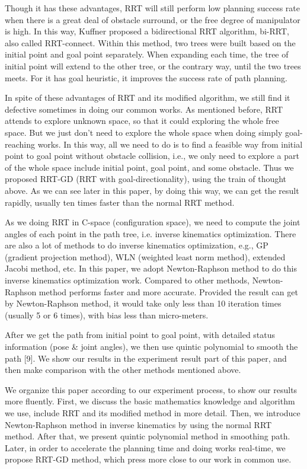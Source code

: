 \documentclass[letterpaper, 10 pt, conference]{ieeeconf}  %
\begin{document}
Though it has these advantages, RRT will still perform low planning success rate when there is a great deal of obstacle surround, or the free degree of manipulator is high. In this way, Kuffner proposed a bidirectional RRT algorithm, bi-RRT, also called RRT-connect. Within this method, two trees were built based on the initial point and goal point separately. When expanding each time, the tree of initial point will extend to the other tree, or the contrary way, until the two trees meets. For it has goal heuristic, it improves the success rate of path planning.  

In spite of these advantages of RRT and its modified algorithm, we still find it defective sometimes in doing our common works. As mentioned before, RRT attends to explore unknown space, so that it could exploring the whole free space. But we just don’t need to explore the whole space when doing simply goal-reaching works. In this way, all we need to do is to find a feasible way from initial point to goal point without obstacle collision, i.e., we only need to explore a part of the whole space include initial point, goal point, and some obstacle. Thus we proposed RRT-GD (RRT with goal-directionality), using the train of thought above. As we can see later in this paper, by doing this way, we can get the result rapidly, usually ten times faster than the normal RRT method.

As we doing RRT in C-space (configuration space), we need to compute the joint angles of each point in the path tree, i.e. inverse kinematics optimization. There are also a lot of methods to do inverse kinematics optimization, e.g., GP (gradient projection method), WLN (weighted least norm	 method), extended Jacobi method, etc. In this paper, we adopt Newton-Raphson method to do this inverse kinematics optimization work. Compared to other methods, Newton-Raphson method performs faster and more accurate. Provided the result can get by Newton-Raphson method, it would take only less than 10 iteration times (usually 5 or 6 times), with bias less than micro-meters. 

After we get the path from initial point to goal point, with detailed status information (pose \& joint angles), we then use quintic polynomial to smooth the path [9]. We show our results in the experiment result part of this paper, and then make comparison with the other methods mentioned above.  

We organize this paper according to our experiment process, to show our results more fluently. First, we discuss the basic mathematics knowledge and algorithm we use, include RRT and its modified method in more detail. Then, we introduce Newton-Raphson method in inverse kinematics by using the normal RRT method. After that, we present quintic polynomial method in smoothing path. Later, in order to accelerate the planning time and doing works real-time, we propose RRT-GD method, which press more close to our work in common use.
\end{document}
